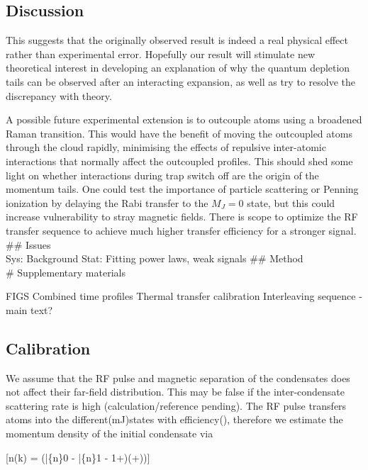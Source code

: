 \hypertarget{discussion}{%
\subsection{Discussion}\label{discussion}}

This suggests that the originally observed result is indeed a real
physical effect rather than experimental error. Hopefully our result
will stimulate new theoretical interest in developing an explanation of
why the quantum depletion tails can be observed after an interacting
expansion, as well as try to resolve the discrepancy with theory.

A possible future experimental extension is to outcouple atoms using a
broadened Raman transition. This would have the benefit of moving the
outcoupled atoms through the cloud rapidly, minimising the effects of
repulsive inter-atomic interactions that normally affect the outcoupled
profiles. This should shed some light on whether interactions during
trap switch off are the origin of the momentum tails. One could test the
importance of particle scattering or Penning ionization by delaying the
Rabi transfer to the \(M_J = 0\) state, but this could increase
vulnerability to stray magnetic fields. There is scope to optimize the
RF transfer sequence to achieve much higher transfer efficiency for a
stronger signal. \#\# Issues\\
Sys: Background Stat: Fitting power laws, weak signals \#\# Method\\
\# Supplementary materials

FIGS Combined time profiles Thermal transfer calibration Interleaving
sequence - main text?

\hypertarget{calibration}{%
\subsection{Calibration}\label{calibration}}

We assume that the RF pulse and magnetic separation of the condensates
does not affect their far-field distribution. This may be false if the
inter-condensate scattering rate is high (calculation/reference
pending). The RF pulse transfers atoms into the different(mJ)states with
efficiency(\etaJ), therefore we estimate the momentum density of the
initial condensate via

{[}n(k) = \left(\bar\{n\}0 - \bar\{n\}1 -
1+)(\delta+\lambda)\right){]}

